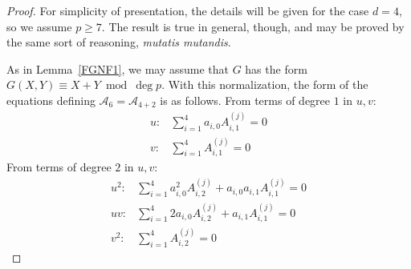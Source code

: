 \documentclass[10pt,a4paper]{amsart}
\begin{document}
\begin{proof}
For simplicity of presentation, the details will be given for the case $d = 4$, so we assume $p \ge 7$.  The result is 
true in general, though, and may be proved by the same sort of reasoning, \emph{mutatis mutandis}.

As in Lemma~\ref{FGNF1}, we may assume that $G$
has the form $G(X,Y) \equiv X + Y \bmod \deg p$.   With this normalization, the 
form of the equations defining $\mathcal{A}_6 = \mathcal{A}_{4 + 2}$ is as follows.
From terms of degree $1$ in $u,v$:
\begin{align*}
u : &\sum_{i=1}^4 a_{i,0} A_{i,1}^{(j)} =0\\
v:  &\sum_{i=1}^4 A_{i,1}^{(j)} = 0
\end{align*}
From terms of degree $2$ in $u,v$:
\begin{align*}
u^2: &\sum_{i=1}^4 a_{i,0}^2 A_{i,2}^{(j)} + a_{i,0} a_{i,1} A_{i,1}^{(j)} = 0\\
uv: &\sum_{i=1}^4 2 a_{i,0} A_{i,2}^{(j)} + a_{i,1} A_{i,1}^{(j)} = 0\\
v^2: &\sum_{i=1}^4 A_{i,2}^{(j)} = 0
\end{align*}


\end{proof}
\end{document}
